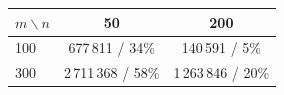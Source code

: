 \begin{tabular}{lcc}
\toprule
$m\backslash n$ & 50 & 200 \\
\midrule
100 & 677\,811 / 34\% & 140\,591 / 5\% \\
300 & 2\,711\,368 / 58\% & 1\,263\,846 / 20\% \\
\bottomrule
\end{tabular}